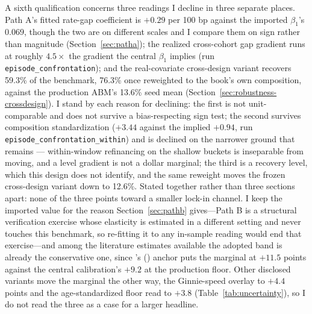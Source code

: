 \documentclass[12pt]{article}
\newcommand{\citepos}[1]{\citeauthor{#1}'s (\citeyear{#1})}
\begin{document}
A sixth qualification concerns three readings I decline in three separate places. Path A's fitted rate-gap coefficient is $+0.29$ per 100 bp against the imported $\beta_1$'s $0.069$, though the two are on different scales and I compare them on sign rather than magnitude (Section~\ref{sec:patha}); the realized cross-cohort gap gradient runs at roughly $4.5\times$ the gradient the central $\beta_1$ implies (run \texttt{episode\_confrontation}); and the real-covariate cross-design variant recovers 59.3\% of the benchmark, 76.3\% once reweighted to the book's own composition, against the production ABM's 13.6\% seed mean (Section~\ref{sec:robustness-crossdesign}). I stand by each reason for declining: the first is not unit-comparable and does not survive a bias-respecting sign test; the second survives composition standardization ($+3.44$ against the implied $+0.94$, run \texttt{episode\_confrontation\_within}) and is declined on the narrower ground that remains --- within-window refinancing on the shallow buckets is inseparable from moving, and a level gradient is not a dollar marginal; the third is a recovery level, which this design does not identify, and the same reweight moves the frozen cross-design variant down to 12.6\%. Stated together rather than three sections apart: none of the three points toward a smaller lock-in channel. I keep the imported value for the reason Section~\ref{sec:pathb} gives---Path B is a structural verification exercise whose elasticity is estimated in a different setting and never touches this benchmark, so re-fitting it to any in-sample reading would end that exercise---and among the literature estimates available the adopted band is already the conservative one, since \citepos{fonseca2024} anchor puts the marginal at $+11.5$ points against the central calibration's $+9.2$ at the production floor. Other disclosed variants move the marginal the other way, the Ginnie-speed overlay to $+4.4$ points and the age-standardized floor read to $+3.8$ (Table~\ref{tab:uncertainty}), so I do not read the three as a case for a larger headline.
\end{document}
